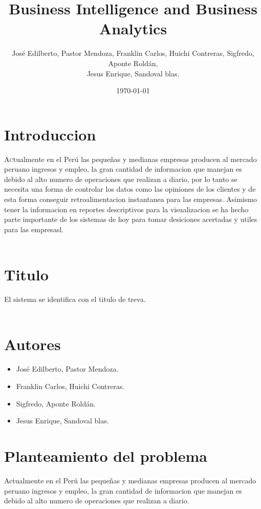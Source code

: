 \documentclass[twoside,twocolumn]{article}
\title{Business Intelligence and Business Analytics}
\author{José Edilberto, Pastor Mendoza, Franklin Carlos, Huichi Contreras, Sigfredo, Aponte Roldán, \\
Jesus Enrique, Sandoval blas. }
\date{\today}
\begin{document}
\maketitle


\section{Introduccion}
\lettrine[nindent=0em,lines=3]{A}ctualmente en el Perú las pequeñas y medianas empresas producen al mercado peruano ingresos y empleo, la gran cantidad de informacion que manejan es debido al alto numero de operaciones que realizan a diario, por lo tanto se necesita una forma de controlar los datos como las opiniones de los clientes y de esta forma conseguir retroalimentacion instantanea para las empresas. Asimismo tener la informacion en reportes descriptivos para la visualizacion se ha hecho parte importante de los sistemas de hoy para tomar desiciones acertadas y utiles para las empresasl.\\ \\

\section{Titulo}
El sistema se identifica con el titulo de treva.\\ \\

\section{Autores}
\begin{itemize}
\item José Edilberto, Pastor Mendoza.
\item Franklin Carlos, Huichi Contreras.
\item Sigfredo, Aponte Roldán.
\item Jesus Enrique, Sandoval blas.
\end{itemize}
\section{Planteamiento del problema}
Actualmente en el Perú las pequeñas y medianas empresas producen al mercado peruano ingresos y empleo, la gran cantidad de informacion que manejan es debido al alto numero de operaciones que realizan a diario.\\ \\
\end{document}

